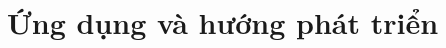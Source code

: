 \documentclass{article}
\begin{document}

\section{Ứng dụng và hướng phát triển}






\end{document}

